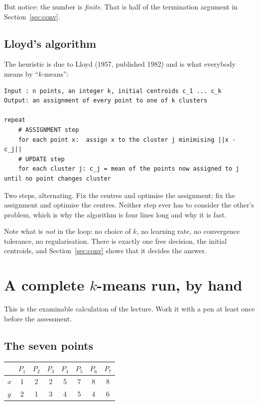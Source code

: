 \documentclass[11pt]{article}
\begin{document}
But notice: the number is \emph{finite}. That is half of the termination
argument in Section~\ref{sec:conv}.

\subsection{Lloyd's algorithm}

The heuristic is due to Lloyd (1957, published 1982) and is what everybody
means by ``$k$-means'':

\begin{lstlisting}
Input : n points, an integer k, initial centroids c_1 ... c_k
Output: an assignment of every point to one of k clusters

repeat
    # ASSIGNMENT step
    for each point x:  assign x to the cluster j minimising ||x - c_j||
    # UPDATE step
    for each cluster j: c_j = mean of the points now assigned to j
until no point changes cluster
\end{lstlisting}

Two steps, alternating. Fix the centres and optimise the assignment; fix the
assignment and optimise the centres. Neither step ever has to consider the
other's problem, which is why the algorithm is four lines long and why it is
fast.

Note what is \emph{not} in the loop: no choice of $k$, no learning rate, no
convergence tolerance, no regularisation. There is exactly one free decision,
the initial centroids, and Section~\ref{sec:conv} shows that it decides the
answer.

\section{A complete $k$-means run, by hand}
\label{sec:hand}

This is the examinable calculation of the lecture. Work it with a pen at
least once before the assessment.

\subsection{The seven points}

\begin{center}
\begin{tabular}{lccccccc}
  \toprule
  & $P_1$ & $P_2$ & $P_3$ & $P_4$ & $P_5$ & $P_6$ & $P_7$ \\
  \midrule
  $x$ & 1 & 2 & 2 & 5 & 7 & 8 & 8 \\
  $y$ & 2 & 1 & 3 & 4 & 5 & 4 & 6 \\
  \bottomrule
\end{tabular}
\end{center}
\end{document}
